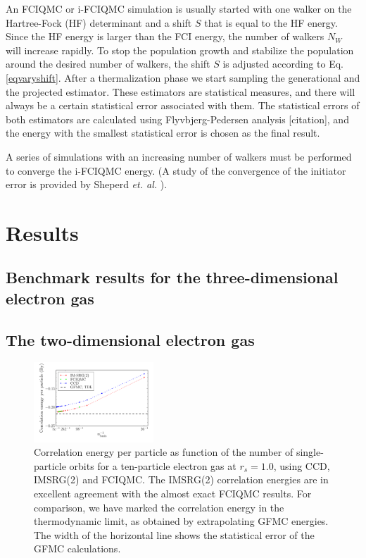 \documentclass[aps,twocolumn,showpacs,floatfix,nofootinbib,preprintnumbers,superscriptaddress,amsmath,amssymb]{revtex4-1}
\begin{document}
An FCIQMC or i-FCIQMC simulation is usually started with one walker on
the Hartree-Fock (HF) determinant and a shift $S$ that is equal to the
HF energy. Since the HF energy is larger than the FCI energy, the
number of walkers $N_W$ will increase rapidly. To stop the population
growth and stabilize the population around the desired number of
walkers, the shift $S$ is adjusted according to
Eq. \eqref{eqvaryshift}. After a thermalization phase we start
sampling the generational and the projected estimator.  These
estimators are statistical measures, and there will always be a
certain statistical error associated with them. The statistical errors
of both estimators are calculated using Flyvbjerg-Pedersen analysis
[citation], and the energy with the smallest statistical error is
chosen as the final result.

A series of simulations with an increasing number of walkers must be
performed to converge the i-FCIQMC energy. (A study of the convergence
of the initiator error is provided by Sheperd {\it et. al.}
\cite{shepherd2012c}).


\section{Results}
\label{sec:results}
\subsection{Benchmark results for the three-dimensional electron gas}

\subsection{The two-dimensional electron gas}

\begin{figure}[hbtp]
     \begin{center}

            \includegraphics[width=0.4\textwidth]{figures/nOrbitsEneN10Rs10.pdf}
    \end{center}
    \caption{Correlation energy per particle as function of the number of
single-particle orbits for a ten-particle electron gas at $r_s=1.0$, using CCD, IMSRG(2) 
and FCIQMC. The IMSRG(2)
correlation energies are in excellent agreement with the almost
exact FCIQMC results. For comparison, we have marked the correlation
energy in the thermodynamic limit, as obtained by extrapolating GFMC
energies. The width of the horizontal line shows the statistical error of
the GFMC calculations.}
            \label{fig:N10}
\end{figure}
\end{document}
